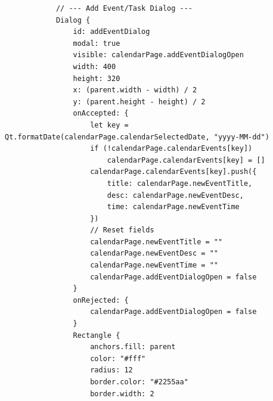 \documentclass{report}
\begin{document}
\begin{lstlisting}
            // --- Add Event/Task Dialog ---
            Dialog {
                id: addEventDialog
                modal: true
                visible: calendarPage.addEventDialogOpen
                width: 400
                height: 320
                x: (parent.width - width) / 2
                y: (parent.height - height) / 2
                onAccepted: {
                    let key = Qt.formatDate(calendarPage.calendarSelectedDate, "yyyy-MM-dd")
                    if (!calendarPage.calendarEvents[key])
                        calendarPage.calendarEvents[key] = []
                    calendarPage.calendarEvents[key].push({
                        title: calendarPage.newEventTitle,
                        desc: calendarPage.newEventDesc,
                        time: calendarPage.newEventTime
                    })
                    // Reset fields
                    calendarPage.newEventTitle = ""
                    calendarPage.newEventDesc = ""
                    calendarPage.newEventTime = ""
                    calendarPage.addEventDialogOpen = false
                }
                onRejected: {
                    calendarPage.addEventDialogOpen = false
                }
                Rectangle {
                    anchors.fill: parent
                    color: "#fff"
                    radius: 12
                    border.color: "#2255aa"
                    border.width: 2


\end{lstlisting}
\end{document}
